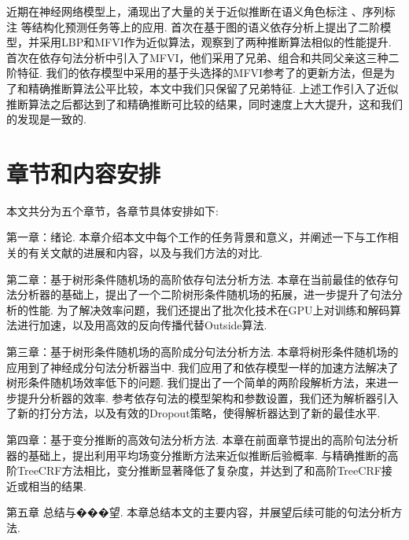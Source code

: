 近期在神经网络模型上，涌现出了大量的关于近似推断在语义角色标注 \citep{li-etal-2020-high}、序列标注 \citep{wang-etal-2020-ain}等结构化预测任务等上的应用.
\citet{wang-etal-2019-second}首次在基于图的语义依存分析上提出了二阶模型，并采用LBP和MFVI作为近似算法，观察到了两种推断算法相似的性能提升.
\citet{wang-tu-2020-second}首次在依存句法分析中引入了MFVI，他们采用了兄弟、组合和共同父亲这三种二阶特征.
我们的依存模型中采用的基于头选择的MFVI参考了\citet{wang-tu-2020-second}的更新方法，但是为了和精确推断算法公平比较，本文中我们只保留了兄弟特征.
上述工作引入了近似推断算法之后都达到了和精确推断可比较的结果，同时速度上大大提升，这和我们的发现是一致的.

\section{章节和内容安排}

本文共分为五个章节，各章节具体安排如下:

第一章：绪论.
本章介绍本文中每个工作的任务背景和意义，并阐述一下与工作相关的有关文献的进展和内容，以及与我们方法的对比.

第二章：基于树形条件随机场的高阶依存句法分析方法.
本章在当前最佳的依存句法分析器的基础上，提出了一个二阶树形条件随机场的拓展，进一步提升了句法分析的性能.
为了解决效率问题，我们还提出了批次化技术在GPU上对训练和解码算法进行加速，以及用高效的反向传播代替Outside算法.

第三章：基于树形条件随机场的高阶成分句法分析方法.
本章将树形条件随机场的应用到了神经成分句法分析器当中.
我们应用了和依存模型一样的加速方法解决了树形条件随机场效率低下的问题.
我们提出了一个简单的两阶段解析方法，来进一步提升分析器的效率.
参考依存句法的模型架构和参数设置，我们还为解析器引入了新的打分方法，以及有效的Dropout策略，使得解析器达到了新的最佳水平.

第四章：基于变分推断的高效句法分析方法.
本章在前面章节提出的高阶句法分析器的基础上，提出利用平均场变分推断方法来近似推断后验概率.
与精确推断的高阶TreeCRF方法相比，变分推断显著降低了复杂度，并达到了和高阶TreeCRF接近或相当的结果.

第五章 总结与���望.
本章总结本文的主要内容，并展望后续可能的句法分析方法.
